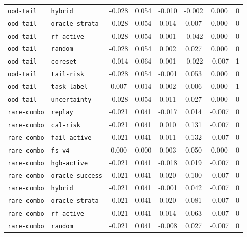 \documentclass{article}
\begin{document}
\begin{center}
\begin{tabular}{llcccccc}
\texttt{ood-tail} & \texttt{hybrid} & -0.028 & 0.054 & -0.010 & -0.002 & 0.000 & 0 \\
\texttt{ood-tail} & \texttt{oracle-strata} & -0.028 & 0.054 & 0.014 & 0.007 & 0.000 & 0 \\
\texttt{ood-tail} & \texttt{rf-active} & -0.028 & 0.054 & 0.001 & -0.042 & 0.000 & 0 \\
\texttt{ood-tail} & \texttt{random} & -0.028 & 0.054 & 0.002 & 0.027 & 0.000 & 0 \\
\texttt{ood-tail} & \texttt{coreset} & -0.014 & 0.064 & 0.001 & -0.022 & -0.007 & 1 \\
\texttt{ood-tail} & \texttt{tail-risk} & -0.028 & 0.054 & -0.001 & 0.053 & 0.000 & 0 \\
\texttt{ood-tail} & \texttt{task-label} & 0.007 & 0.014 & 0.002 & 0.006 & 0.000 & 1 \\
\texttt{ood-tail} & \texttt{uncertainty} & -0.028 & 0.054 & 0.011 & 0.027 & 0.000 & 0 \\
\texttt{rare-combo} & \texttt{replay} & -0.021 & 0.041 & -0.017 & 0.014 & -0.007 & 0 \\
\texttt{rare-combo} & \texttt{cal-risk} & -0.021 & 0.041 & 0.010 & 0.131 & -0.007 & 0 \\
\texttt{rare-combo} & \texttt{fail-active} & -0.021 & 0.041 & 0.011 & 0.132 & -0.007 & 0 \\
\texttt{rare-combo} & \texttt{fs-v4} & 0.000 & 0.000 & 0.003 & 0.050 & 0.000 & 0 \\
\texttt{rare-combo} & \texttt{hgb-active} & -0.021 & 0.041 & -0.018 & 0.019 & -0.007 & 0 \\
\texttt{rare-combo} & \texttt{oracle-success} & -0.021 & 0.041 & 0.020 & 0.100 & -0.007 & 0 \\
\texttt{rare-combo} & \texttt{hybrid} & -0.021 & 0.041 & -0.001 & 0.042 & -0.007 & 0 \\
\texttt{rare-combo} & \texttt{oracle-strata} & -0.021 & 0.041 & 0.020 & 0.081 & -0.007 & 0 \\
\texttt{rare-combo} & \texttt{rf-active} & -0.021 & 0.041 & 0.014 & 0.063 & -0.007 & 0 \\
\texttt{rare-combo} & \texttt{random} & -0.021 & 0.041 & -0.008 & 0.027 & -0.007 & 0 \\
\bottomrule
\end{tabular}
\end{center}
\end{document}
